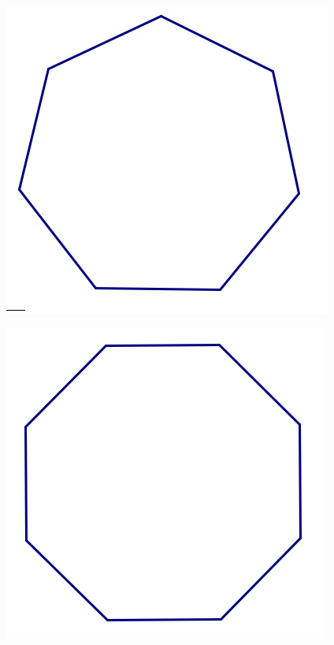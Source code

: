\begin{center}
\includegraphics[scale = .75]{heptagon}

\includegraphics[scale = .75]{octagon}

\end{center}


